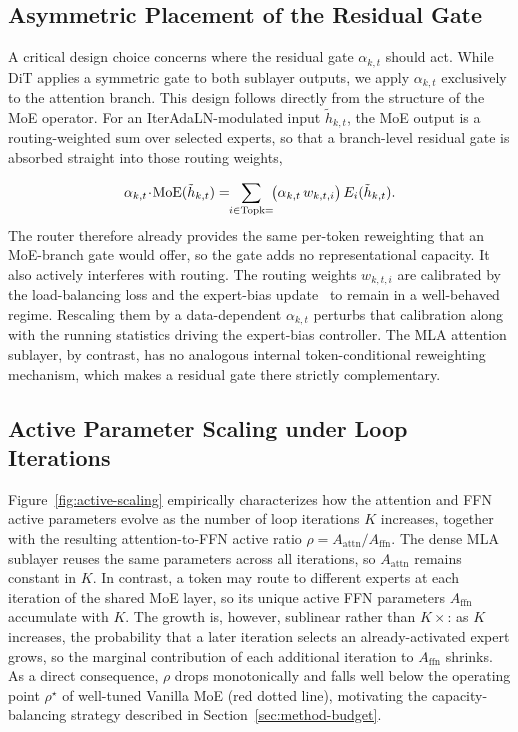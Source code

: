 \subsection{Asymmetric Placement of the Residual Gate}
\label{app:alpha-asymmetric}
A critical design choice concerns where the residual gate $\alpha_{k,t}$ should act. While DiT applies a symmetric gate to both sublayer outputs, we apply $\alpha_{k,t}$ exclusively to the attention branch. This design follows directly from the structure of the MoE operator. For an IterAdaLN-modulated input $\tilde h_{k,t}$, the MoE output is a routing-weighted sum over selected experts, so that a branch-level residual gate is absorbed straight into those routing weights,

\begin{equation}
\small
  \alpha_{k,t}\!\cdot\!\mathrm{MoE}(\tilde h_{k,t})
  = \!\!\sum_{i\in\mathrm{Topk=}}\!\!\big(\alpha_{k,t}\, w_{k,t,i}\big)\,
         E_i(\tilde h_{k,t}).
  \label{eq:gate-absorb}
\end{equation}
The router therefore already provides the same per-token reweighting that an MoE-branch gate would offer, so the gate adds no representational capacity. It also actively interferes with routing. The routing weights $w_{k,t,i}$ are calibrated by the load-balancing loss and the expert-bias update~\cite{liu2024deepseek} to remain in a well-behaved regime. Rescaling them by a data-dependent $\alpha_{k,t}$ perturbs that calibration along with the running statistics driving the expert-bias controller. The MLA attention sublayer, by contrast, has no analogous internal token-conditional reweighting mechanism, which makes a residual gate there strictly complementary.


\subsection{Active Parameter Scaling under Loop Iterations}
\label{app:active-scaling}

Figure~\ref{fig:active-scaling} empirically characterizes how the attention and FFN active parameters evolve as the number of loop iterations $K$ increases, together with the resulting attention-to-FFN active ratio $\rho = A_{\mathrm{attn}}/A_{\mathrm{ffn}}$. The dense MLA sublayer reuses the same parameters across all iterations, so $A_{\mathrm{attn}}$ remains constant in $K$. In contrast, a token may route to different experts at each iteration of the shared MoE layer, so its unique active FFN parameters $A_{\mathrm{ffn}}$ accumulate with $K$. The growth is, however, sublinear rather than $K\!\times\!$: as $K$ increases, the probability that a later iteration selects an already-activated expert grows, so the marginal contribution of each additional iteration to $A_{\mathrm{ffn}}$ shrinks. As a direct consequence, $\rho$ drops monotonically and falls well below the operating point $\rho^{\star}$ of well-tuned Vanilla MoE (red dotted line), motivating the capacity-balancing strategy described in Section~\ref{sec:method-budget}.

